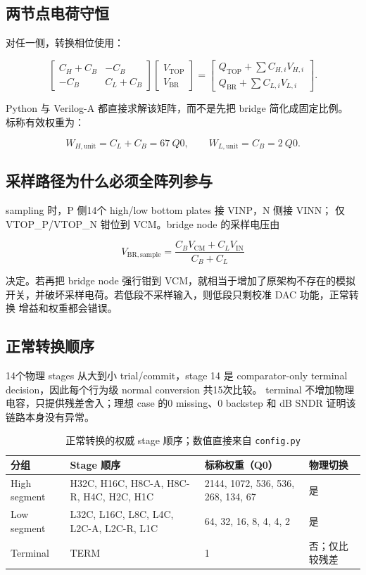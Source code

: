 \documentclass[UTF8,11pt,a4paper]{ctexart}
\newcommand{\code}[1]{\texttt{\small #1}}
\newcommand{\tablehead}{\rowcolor{PaleBlue}\bfseries\sffamily\color{DeepNavy}}
\begin{document}
\subsection{两节点电荷守恒}

对任一侧，转换相位使用：

\[
\begin{bmatrix}
C_H+C_B & -C_B\\
-C_B & C_L+C_B
\end{bmatrix}
\begin{bmatrix}
V_{\mathrm{TOP}}\\
V_{\mathrm{BR}}
\end{bmatrix}
=
\begin{bmatrix}
Q_{\mathrm{TOP}}+\sum C_{H,i}V_{H,i}\\
Q_{\mathrm{BR}}+\sum C_{L,i}V_{L,i}
\end{bmatrix}.
\]

Python 与 Verilog-A 都直接求解该矩阵，而不是先把 bridge 简化成固定比例。
标称有效权重为：

\[
  W_{H,\mathrm{unit}}=C_L+C_B=67\ Q0,\qquad
  W_{L,\mathrm{unit}}=C_B=2\ Q0.
\]

\subsection{采样路径为什么必须全阵列参与}

sampling 时，P 侧14个 high/low bottom plates 接 VINP，N 侧接 VINN；
仅 VTOP\_P/VTOP\_N 钳位到 VCM。bridge node 的采样电压由

\[
  V_{\mathrm{BR,sample}}
  =
  \frac{C_BV_{\mathrm{CM}}+C_LV_{\mathrm{IN}}}{C_B+C_L}
\]

决定。若再把 bridge node 强行钳到 VCM，就相当于增加了原架构不存在的模拟
开关，并破坏采样电荷。若低段不采样输入，则低段只剩校准 DAC 功能，正常转换
增益和权重都会错误。

\subsection{正常转换顺序}

14个物理 stages 从大到小 trial/commit，stage 14 是 comparator-only
terminal decision，因此每个行为级 normal conversion 共15次比较。
terminal 不增加物理电容，只提供残差舍入；理想 case 的0 missing、0 backstep
和 \IdealCalSndr{} dB SNDR 证明该链路本身没有异常。

\begin{table}[H]
  \centering
  \caption{正常转换的权威 stage 顺序；数值直接来自 \code{config.py}}
  \begin{tabularx}{\textwidth}{@{}p{24mm}Y p{34mm}p{25mm}@{}}
    \toprule
    \tablehead 分组 & Stage 顺序 & 标称权重（Q0） & 物理切换\\
    \midrule
    High segment & H32C, H16C, H8C-A, H8C-R, H4C, H2C, H1C &
      2144, 1072, 536, 536, 268, 134, 67 & 是\\
    Low segment & L32C, L16C, L8C, L4C, L2C-A, L2C-R, L1C &
      64, 32, 16, 8, 4, 4, 2 & 是\\
    Terminal & TERM & 1 & 否；仅比较残差\\
    \bottomrule
  \end{tabularx}
\end{table}
\end{document}

